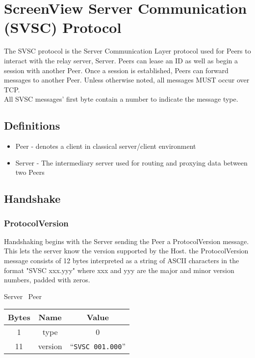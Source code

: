 \section{ScreenView Server Communication (SVSC) Protocol }

The SVSC protocol is the Server Communication Layer protocol used for Peers to interact with the relay server,
Server. Peers can lease an ID as well as begin a session with another Peer. Once a session is established, Peers can
forward messages to another Peer. Unless otherwise noted, all messages MUST occur over TCP.\\

All SVSC messages' first byte contain a number to indicate the message type.

\subsection{Definitions}

\begin{itemize}
    \item Peer - denotes a client in classical server/client environment
    \item Server - The intermediary server used for routing and proxying data between two Peers
\end{itemize}

\subsection{Handshake}

\subsubsection{ProtocolVersion}

Handshaking begins with the Server sending the Peer a ProtocolVersion message. This lets the server know
the version supported by the Host. the ProtocolVersion message consists of 12 bytes interpreted as a string of ASCII
characters in the format
"SVSC xxx.yyy" where xxx and yyy are the major and minor version numbers, padded with zeros.

\begin{center}
    Server \textrightarrow\ Peer\\
    \begin{tabular}{|c|c|c|}
        \hline
        \textbf{Bytes} & \textbf{Name} & \textbf{Value}            \\
        \hline
        1              & type          & 0              \\
        \hline
        11             & version       & ``\texttt{SVSC 001.000}'' \\
        \hline
    \end{tabular}
\end{center}

